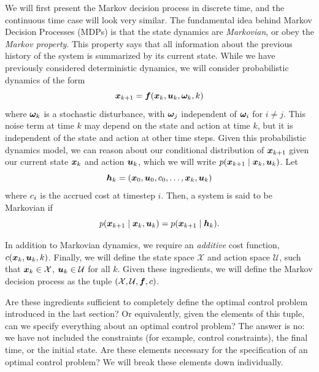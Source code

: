 We will first present the Markov decision process in discrete time, and the continuous time case will look very similar. The fundamental idea behind Markov Decision Processes (MDPs) is that the state dynamics are \textit{Markovian}, or obey the \textit{Markov property}. This property says that all information about the previous history of the system is summarized by its current state. While we have previously considered deterministic dynamics, we will consider probabilistic dynamics of the form 
\begin{equation}
    \bm{x}_{k+1} = \bm{f}(\bm{x}_k, \bm{u}_k, \bm{\omega}_k, k)
\end{equation}
where $\bm{\omega}_k$ is a stochastic disturbance, with $\bm{\omega}_j$ independent of $\bm{\omega}_i$ for $i \neq j$. This noise term at time $k$ may depend on the state and action at time $k$, but it is independent of the state and action at other time steps. Given this probabilistic dynamics model, we can reason about our conditional distribution of $\bm{x}_{k+1}$ given our current state $\bm{x}_k$ and action $\bm{u}_k$, which we will write $p(\bm{x}_{k+1} \mid \bm{x}_k, \bm{u}_k)$. Let 
\begin{equation}
\bm{h}_k =(\bm{x}_0, \bm{u}_0, c_0, \ldots, \bm{x}_k, \bm{u}_k)    
\end{equation} 
where $c_i$ is the accrued cost at timestep $i$. Then, a system is said to be Markovian if
\begin{equation}
    p(\bm{x}_{k+1} \mid \bm{x}_k, \bm{u}_k) = p(\bm{x}_{k+1} \mid \bm{h}_k).
\end{equation}

In addition to Markovian dynamics, we require an \textit{additive} cost function, $c(\bm{x}_k, \bm{u}_k, k)$. Finally, we will define the state space $\mathcal{X}$ and action space $\mathcal{U}$, such that $\bm{x}_k \in \mathcal{X}$, $\bm{u}_k \in \mathcal{U}$ for all $k$. Given these ingredients, we will define the Markov decision process as the tuple $(\mathcal{X}, \mathcal{U}, \bm{f}, c)$. 

Are these ingredients sufficient to completely define the optimal control problem introduced in the last section? Or equivalently, given the elements of this tuple, can we specify everything about an optimal control problem? The answer is no: we have not included the constraints (for example, control constraints), the final time, or the initial state. Are these elements necessary for the specification of an optimal control problem? We will break these elements down individually.

